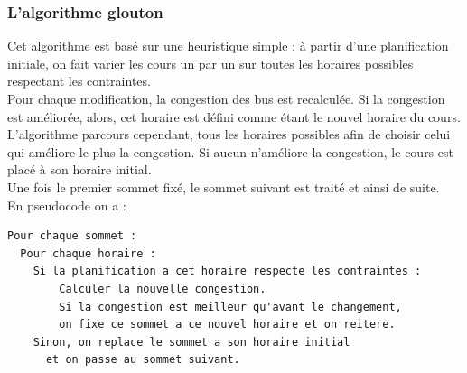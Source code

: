 \documentclass[a4paper,11pt]{article}
\begin{document}
		\subsubsection{L'algorithme glouton}
			Cet algorithme est basé sur une heuristique simple : à partir d'une planification initiale, on fait varier les cours un par un sur toutes les horaires possibles respectant les contraintes.\\
			Pour chaque modification, la congestion des bus est recalculée. Si la congestion est améliorée, alors,  cet horaire est défini comme étant le nouvel horaire du cours.\\
			L'algorithme parcours cependant, tous les horaires possibles afin de choisir celui qui améliore le plus la congestion. Si aucun n'améliore la congestion, le cours est placé à son horaire initial.\\
			Une fois le premier sommet fixé, le sommet suivant est traité et ainsi de suite.\\
			En pseudocode on a :\\
\begin{lstlisting}
Pour chaque sommet :
  Pour chaque horaire :
  	Si la planification a cet horaire respecte les contraintes :
    	Calculer la nouvelle congestion.
    	Si la congestion est meilleur qu'avant le changement,
      	on fixe ce sommet a ce nouvel horaire et on reitere. 
    Sinon, on replace le sommet a son horaire initial 
      et on passe au sommet suivant.
		\end{lstlisting}
\end{document}
